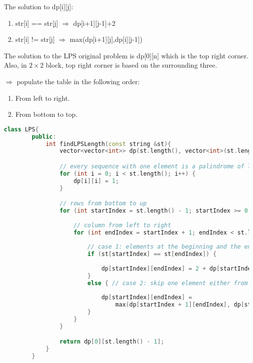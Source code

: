     The solution to dp[i][j]:

    \begin{enumerate}
        \item str[i] == str[j] $\Rightarrow$  dp[i+1][j-1]+2
        \item str[i] != str[j] $\Rightarrow$ max(dp[i+1][j],dp[i][j-1])
    \end{enumerate}

    The solution to the LPS original problem is dp[0][n] which is the top right corner. Also, in $2\times 2$ block, top right corner
    is based on the surrounding three.

    $\Rightarrow$ populate the table in the following order:
    \begin{enumerate}
        \item From left to right.
        \item From bottom to top.
    \end{enumerate}


\begin{lstlisting}[language=C++,basicstyle=\tiny]
    class LPS{
        public:
            int findLPSLength(const string &st){
                vector<vector<int>> dp(st.length(), vector<int>(st.length(), 0));

                // every sequence with one element is a palindrome of length 1
                for (int i = 0; i < st.length(); i++) {
                    dp[i][i] = 1;
                }

                // rows from bottom to up
                for (int startIndex = st.length() - 1; startIndex >= 0; startIndex--) {
                    
                    // column from left to right
                    for (int endIndex = startIndex + 1; endIndex < st.length(); endIndex++) {
                        
                        // case 1: elements at the beginning and the end are the same
                        if (st[startIndex] == st[endIndex]) {
                            
                            dp[startIndex][endIndex] = 2 + dp[startIndex + 1][endIndex - 1];
                        } 
                        else { // case 2: skip one element either from the beginning or the end
                            
                            dp[startIndex][endIndex] =
                                max(dp[startIndex + 1][endIndex], dp[startIndex][endIndex - 1]);
                        }
                    }         
                }

                return dp[0][st.length() - 1];
            }
        }
\end{lstlisting}

